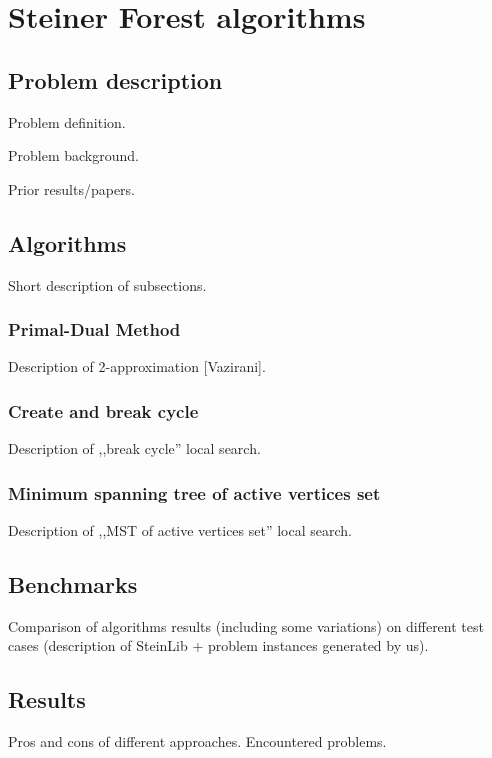 \chapter{Steiner Forest algorithms}

\section{Problem description}
Problem definition.


Problem background.


Prior results/papers.


\section{Algorithms}
Short description of subsections.

\subsection{Primal-Dual Method}
Description of 2-approximation [Vazirani].

\subsection{Create and break cycle}
Description of ,,break cycle'' local search.

\subsection{Minimum spanning tree of active vertices set}
Description of ,,MST of active vertices set'' local search.

\section{Benchmarks}
Comparison of algorithms results (including some variations) on different test cases (description of SteinLib + problem instances generated by us).

\section{Results}
Pros and cons of different approaches. Encountered problems.
